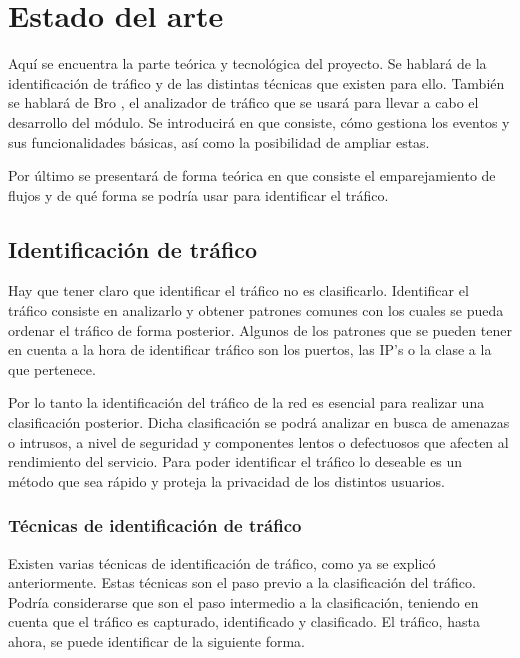 \chapter{Estado del arte}

Aquí se encuentra la parte teórica y tecnológica del proyecto. Se hablará de la identificación de tráfico y de 
las distintas técnicas que existen para ello. También se hablará de Bro \cite{broindex}, el 
analizador de tráfico que se usará para 
llevar a cabo el desarrollo del módulo. Se introducirá en que consiste, cómo gestiona los eventos y sus 
funcionalidades básicas, así como la posibilidad de ampliar estas.

\intro Por último se presentará de forma teórica en que consiste el emparejamiento de flujos y de qué forma 
se podría usar para identificar el tráfico.

\section{Identificación de tráfico}

Hay que tener claro que identificar el tráfico no es clasificarlo. Identificar el tráfico consiste en analizarlo 
y obtener patrones comunes con los cuales se pueda ordenar el tráfico de forma posterior. Algunos de los patrones 
que se pueden tener en cuenta a la hora de identificar tráfico son los puertos, las IP's o la clase a la que 
pertenece.

\intro Por lo tanto la identificación del tráfico de la red es esencial para realizar una clasificación 
posterior. Dicha clasificación se podrá analizar en busca de amenazas o intrusos, a nivel de seguridad 
y componentes lentos o defectuosos que afecten al rendimiento del servicio. Para poder identificar el 
tráfico lo deseable es un método que sea rápido y proteja la privacidad de los distintos usuarios.

\subsection{Técnicas de identificación de tráfico}

Existen varias técnicas de identificación de tráfico, como ya se explicó anteriormente. Estas técnicas son 
el paso previo a la clasificación del tráfico. Podría considerarse que son el paso intermedio a la clasificación, 
teniendo en cuenta que el tráfico es capturado, identificado y clasificado. El tráfico, hasta ahora, se puede identificar de la siguiente forma.

